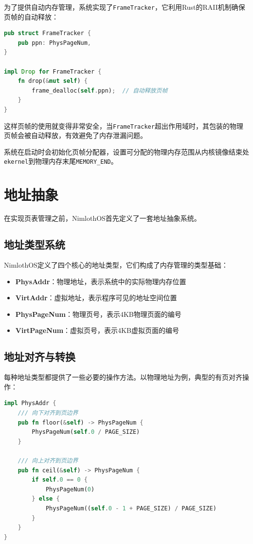 为了提供自动内存管理，系统实现了\lstinline[language=Rust]{FrameTracker}，它利用Rust的RAII机制确保页帧的自动释放：

\begin{lstlisting}[language=Rust,caption={页帧跟踪器}, label={lst:frame-tracker}]
pub struct FrameTracker {
    pub ppn: PhysPageNum,
}

impl Drop for FrameTracker {
    fn drop(&mut self) {
        frame_dealloc(self.ppn);  // 自动释放页帧
    }
}
\end{lstlisting}

这样页帧的使用就变得非常安全，当\lstinline[language=Rust]{FrameTracker}超出作用域时，其包装的物理页帧会被自动释放，有效避免了内存泄漏问题。

系统在启动时会初始化页帧分配器，设置可分配的物理内存范围从内核镜像结束处\lstinline[language=Rust]{ekernel}到物理内存末尾\lstinline[language=Rust]{MEMORY_END}。

\section{地址抽象}

在实现页表管理之前，NimlothOS首先定义了一套地址抽象系统。

\subsection{地址类型系统}

NimlothOS定义了四个核心的地址类型，它们构成了内存管理的类型基础：

\begin{itemize}
    \item \textbf{PhysAddr}：物理地址，表示系统中的实际物理内存位置
    \item \textbf{VirtAddr}：虚拟地址，表示程序可见的地址空间位置  
    \item \textbf{PhysPageNum}：物理页号，表示4KB物理页面的编号
    \item \textbf{VirtPageNum}：虚拟页号，表示4KB虚拟页面的编号
\end{itemize}

\subsection{地址对齐与转换}

每种地址类型都提供了一些必要的操作方法。以物理地址为例，典型的有页对齐操作：

\begin{lstlisting}[language=Rust,caption={地址对齐操作}, label={lst:addr-align}]
impl PhysAddr {
    /// 向下对齐到页边界
    pub fn floor(&self) -> PhysPageNum {
        PhysPageNum(self.0 / PAGE_SIZE)
    }

    /// 向上对齐到页边界  
    pub fn ceil(&self) -> PhysPageNum {
        if self.0 == 0 {
            PhysPageNum(0)
        } else {
            PhysPageNum((self.0 - 1 + PAGE_SIZE) / PAGE_SIZE)
        }
    }
}
\end{lstlisting}

